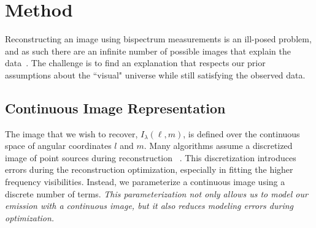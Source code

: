 \section{Method}
\label{section:Method}

Reconstructing an image using bispectrum measurements is an ill-posed problem, and as such there are an infinite number of possible images that explain the data~\cite{rusenimaging}. 
The challenge is to find an explanation that respects our prior assumptions about the ``visual" universe
while still satisfying the observed data. 




\subsection{Continuous Image Representation}


The image that we wish to recover, $I_{\lambda}(\ell,m)$, is defined over the continuous space of angular coordinates $l$ and $m$. 
Many algorithms assume a discretized image of point sources during reconstruction 
~\cite{taylor1999synthesis}. This discretization introduces errors during the reconstruction optimization, especially in fitting the higher frequency visibilities.
Instead, we parameterize a continuous image using a discrete number of terms. 
{\it This parameterization not only allows us to model our emission with a continuous image, but it also reduces modeling errors during optimization. }

